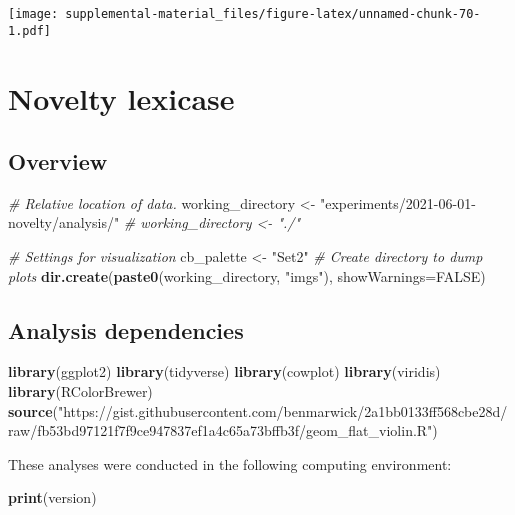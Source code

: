 \documentclass[]{book}
\newenvironment{Shaded}{\begin{snugshade}}{\end{snugshade}}
\newcommand{\CommentTok}[1]{\textcolor[rgb]{0.56,0.35,0.01}{\textit{#1}}}
\newcommand{\DataTypeTok}[1]{\textcolor[rgb]{0.13,0.29,0.53}{#1}}
\newcommand{\KeywordTok}[1]{\textcolor[rgb]{0.13,0.29,0.53}{\textbf{#1}}}
\newcommand{\NormalTok}[1]{#1}
\newcommand{\OtherTok}[1]{\textcolor[rgb]{0.56,0.35,0.01}{#1}}
\newcommand{\StringTok}[1]{\textcolor[rgb]{0.31,0.60,0.02}{#1}}
\begin{document}
\texttt{[image: supplemental-material\_files/figure-latex/unnamed-chunk-70-1.pdf]}

\hypertarget{novelty-lexicase}{%
\chapter{Novelty lexicase}\label{novelty-lexicase}}

\hypertarget{overview-7}{%
\section{Overview}\label{overview-7}}

\begin{Shaded}
\begin{Highlighting}[]
\CommentTok{# Relative location of data.}
\NormalTok{working_directory <-}\StringTok{ "experiments/2021-06-01-novelty/analysis/"}
\CommentTok{# working_directory <- "./"}

\CommentTok{# Settings for visualization}
\NormalTok{cb_palette <-}\StringTok{ "Set2"}
\CommentTok{# Create directory to dump plots}
\KeywordTok{dir.create}\NormalTok{(}\KeywordTok{paste0}\NormalTok{(working_directory, }\StringTok{"imgs"}\NormalTok{), }\DataTypeTok{showWarnings=}\OtherTok{FALSE}\NormalTok{)}
\end{Highlighting}
\end{Shaded}

\hypertarget{analysis-dependencies-7}{%
\section{Analysis dependencies}\label{analysis-dependencies-7}}

\begin{Shaded}
\begin{Highlighting}[]
\KeywordTok{library}\NormalTok{(ggplot2)}
\KeywordTok{library}\NormalTok{(tidyverse)}
\KeywordTok{library}\NormalTok{(cowplot)}
\KeywordTok{library}\NormalTok{(viridis)}
\KeywordTok{library}\NormalTok{(RColorBrewer)}
\KeywordTok{source}\NormalTok{(}\StringTok{"https://gist.githubusercontent.com/benmarwick/2a1bb0133ff568cbe28d/raw/fb53bd97121f7f9ce947837ef1a4c65a73bffb3f/geom_flat_violin.R"}\NormalTok{)}
\end{Highlighting}
\end{Shaded}

These analyses were conducted in the following computing environment:

\begin{Shaded}
\begin{Highlighting}[]
\KeywordTok{print}\NormalTok{(version)}
\end{Highlighting}
\end{Shaded}
\end{document}
